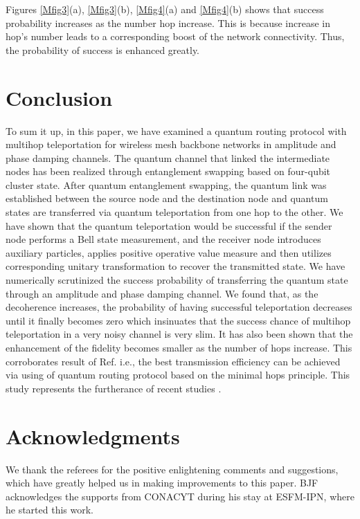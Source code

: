 \documentclass[aps,pra,twocolumn,showpacs,superscriptaddress,groupedaddress]{revtex4}
\begin{document}
Figures \ref{Mfig3}(a), \ref{Mfig3}(b), \ref{Mfig4}(a) and \ref{Mfig4}(b) shows that success probability increases as the number hop increase. This is because increase in hop’s number leads to a corresponding boost of the network connectivity. Thus, the probability of success is enhanced greatly.

\section{Conclusion}
To sum it up, in this paper, we have examined a quantum routing protocol with multihop teleportation for wireless mesh backbone networks in amplitude and phase damping channels. The quantum channel that linked the intermediate nodes has been realized through entanglement swapping based on four-qubit cluster state. After quantum entanglement swapping, the quantum link was established between the source node and the destination node and quantum states are transferred via quantum teleportation from one hop to the other. We have shown that the quantum teleportation would be successful if the sender node performs a Bell state measurement, and the receiver node introduces auxiliary particles, applies positive operative value measure and then utilizes corresponding unitary transformation to recover the transmitted state. We have numerically scrutinized the success probability of transferring the quantum state through an amplitude and phase damping channel.  We found that, as the decoherence increases, the probability of having successful teleportation decreases until it finally becomes zero which insinuates that the success chance of multihop teleportation in a very noisy channel is very slim. It has also been shown that the enhancement of the fidelity becomes smaller as the number of hops increase. This corroborates result of Ref. \cite{MA12} i.e., the best transmission efficiency can be achieved via using of quantum routing protocol based on the minimal hops principle. This study represents the furtherance of recent studies \cite{MA2,MA3,MA93,MA10,MA11,MA12}.

\section*{Acknowledgments}
We thank the referees for the positive enlightening comments and suggestions, which have greatly
helped us in making improvements to this paper. BJF acknowledges the supports from CONACYT during his stay at ESFM-IPN, where he started this work.
\end{document}

